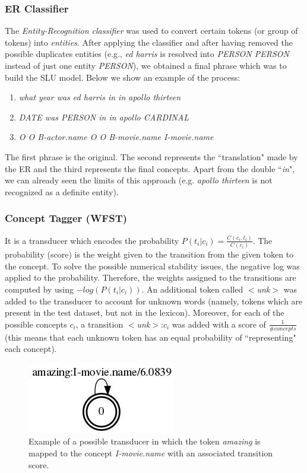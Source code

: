 \documentclass[11pt,a4paper]{article}
\begin{document}
\subsubsection{ER Classifier}

The \textit{Entity-Recognition classifier} was used to convert certain tokens (or group of tokens) into \textit{entities}. After applying the classifier and after having removed the possible duplicates entities (e.g., \textit{ed harris} is resolved into \textit{PERSON PERSON} instead of just one entity \textit{PERSON}), we obtained a final phrase which was to build the SLU model. Below we show an example of the process:

\begin{enumerate}[noitemsep]
\item \textit{what year was ed harris in in apollo thirteen}
\item \textit{DATE was PERSON in in apollo CARDINAL}
\item \textit{O O B-actor.name O O B-movie.name I-movie.name}
\end{enumerate}

The first phrase is the original. The second represents the ``translation" made by the ER and the third represents the final concepts. Apart from the double ``\textit{in}", we can already seen the limits of this approach (e.g. \textit{apollo thirteen} is not recognized as a definite entity). 

\subsubsection{Concept Tagger (WFST)}
It is a transducer which encodes the probability $P(t_i|c_i) = \frac{C(c_i, t_i)}{C(c_i)}$. The probability (score) is the weight given to the transition from the given token to the concept. To solve the possible numerical stability issues, the negative log was applied to the probability. Therefore, the weights assigned to the transitions are computed by using $-log(P(t_i|c_i))$. An additional token called $<$\textit{unk}$>$ was added to the transducer to account for unknown words (namely, tokens which are present in the test dataset, but not in the lexicon). Moreover, for each of the possible concepts $c_i$, a transition $<$\textit{unk}$>$:$c_i$ was added with a score of $\frac{1}{\#concepts}$ (this means that each unknown token has an equal probability of ``representing" each concept). 

\begin{figure}[b!]
	\centering
	\includegraphics[width=0.5\linewidth]{img/pos-tagger}
	\caption{Example of a possible transducer in which the token \textit{amazing} is mapped to the concept \textit{I-movie.name} with an associated transition score.}
\end{figure}
\end{document}
